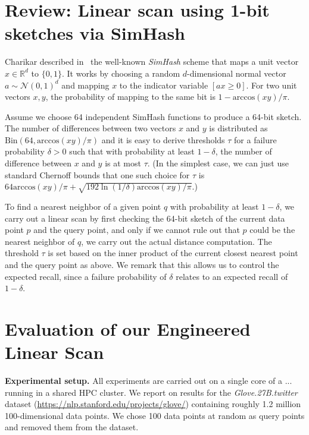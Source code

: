 \documentclass{llncs}
\newcommand{\myparagraph}[1]{\noindent \textbf{#1}}
\begin{document}
\section{Review: Linear scan using 1-bit sketches via SimHash}
\label{app:sketches}

Charikar described in~\cite{Charikar02} the well-known \emph{SimHash} scheme that maps a unit vector $x \in \mathbb{R}^d$ to $\{0,1\}$. 
It works by choosing a random $d$-dimensional normal vector $a \sim \mathcal{N}(0, 1)^d$   and mapping $x$ to the indicator variable $[ax \geq 0]$. For two unit vectors $x,y$, the probability of mapping to the same bit is $1 - \text{arccos}(xy)/\pi$.

Assume we choose 64 independent SimHash functions to produce a 64-bit sketch. The number of differences between two vectors $x$ and $y$ is distributed as $\text{Bin}(64,\text{arccos}(xy)/\pi )$ and it is easy to derive thresholds $\tau$ for a failure probability $\delta > 0$ such that with probability at least $1-\delta$, the number of difference between $x$ and $y$ is at most $\tau$. (In the simplest case, we can just use standard Chernoff bounds that one such choice for $\tau$ is $64\text{arccos}(xy)/\pi  + \sqrt{192 \ln (1/\delta)\text{arccos}(xy)/\pi}$.)

To find a nearest neighbor of a given point $q$ with probability at least $1-\delta$, we carry out a linear scan by first checking the 64-bit sketch of the current data point $p$ and the query point, and only if we cannot rule out that $p$ could be the nearest neighbor of $q$, we carry out the actual distance computation. The threshold $\tau$ is set based on the inner product of the current closest nearest point and the query point as above. We remark that this allows us to control the expected recall, since a failure probability of $\delta$ relates to an expected recall of $1-\delta$.


\section{Evaluation of our Engineered Linear Scan}
\label{app:linear:scan}

\myparagraph{Experimental setup.} All experiments are carried out on a single core of a  ... running in a shared HPC cluster. We report on results for the \emph{Glove.27B.twitter} dataset (\url{https://nlp.stanford.edu/projects/glove/}) containing roughly 1.2 million 100-dimensional data points. We chose 100 data points at random as query points and removed them from the dataset.
\end{document}
